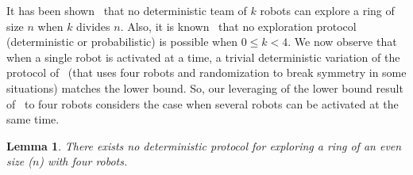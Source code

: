 \documentclass[12pt]{llncs}
\newtheorem{lem}{Lemma}
\begin{document}
It has been shown~\cite{davi07} that no deterministic team of $k$ robots can explore a ring of size $n$ when $k$ divides $n$. Also, it is known~\cite{stap09} that no exploration protocol (deterministic or probabilistic) is possible when $0\leq k < 4$. We now observe that when a single robot is activated at a time, a trivial deterministic variation of the protocol of~\cite{stap09} (that uses four robots and randomization to break symmetry in some situations) matches the lower bound. So, our leveraging of the lower bound result of~\cite{stap09} to four robots considers the case when several robots can be activated at the same time.

\begin{lem}There exists no deterministic protocol for exploring a ring of an even size ($n$) with four robots.
\end{lem}
\end{document}
